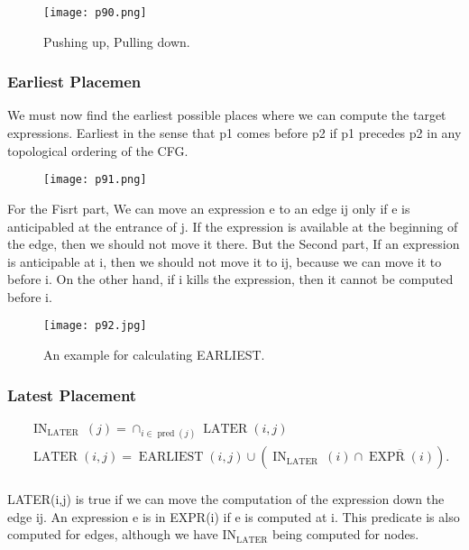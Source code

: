\begin{figure}[H]
    \centering
     \texttt{[image: p90.png]}
         \caption{Pushing up, Pulling down.}
         \label{fig:p90}
\end{figure}

\subsubsection{Earliest	Placemen}

We	must	now	find	the	earliest	possible	places	where	we	
can	compute	the	target	expressions.	Earliest	in	the	sense	that	p1	comes	before	p2	if	p1	precedes	
p2	in	any	topological	ordering	of	the	CFG.

\begin{figure}[H]
    \centering
     \texttt{[image: p91.png]}
         
         \label{fig:p91}
\end{figure}


For the {\color{red} Fisrt} part, We	can	move	an	expression	e	to
an	edge	ij	only	if	e	is	anticipabled	at	the	entrance
of	j.	 If	the	expression	is	available	at	the	beginning	of	the	edge,
then	we	should	not	move	it	there.	
But the {\color{blue} Second} part, If	an	expression	is	anticipable	at	i,	
then	we	should	not	move	it	to	ij,	because	we	can	move	it	to	before	i.	
On	the	other	hand,	if	i	kills	the	expression,	then	it	cannot	
be	computed	before	i.


\begin{figure}[H]
    \centering
     \texttt{[image: p92.jpg]}
         \caption{An example for calculating EARLIEST.}
         \label{fig:p92}
\end{figure}

\subsubsection{Latest	Placement}


$$
\begin{aligned}
&\operatorname{IN}_{\text {LATER }}(j)=\cap_{i \in \operatorname{pred}(j)} \operatorname{LATER}(i, j) \\
&\operatorname{LATER}(i, j)=\operatorname{EARLIEST}(i, j) \cup\left(\operatorname{IN}_{\text {LATER }}(i) \cap \overline{\operatorname{EXPR}(i)}\right). \\
&
\end{aligned}
$$


LATER(i,j)	is	true	if	we	can	move	the	computation	of	the	
expression	down	the	edge	ij.	 An	expression	e	is	in	
EXPR(i)	if	e	is	computed	at	i.	This	predicate	is	also
 computed	for	edges,	although	we	
have	IN$_\mathrm{LATER}$	being	computed	for	nodes.	



